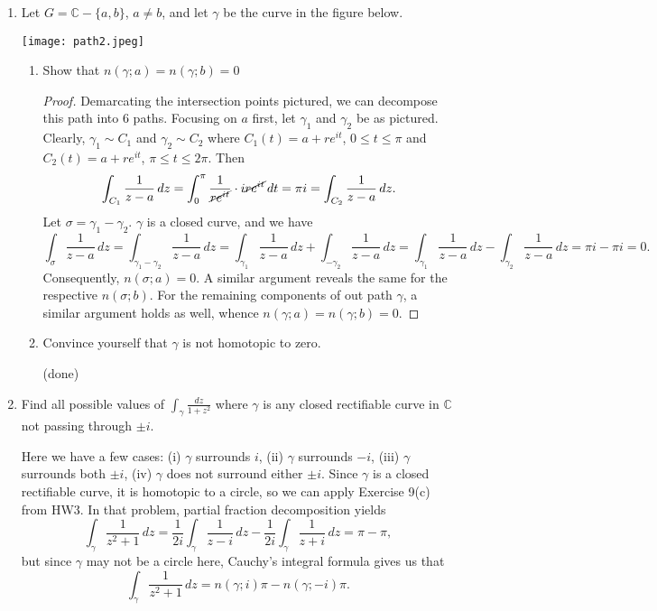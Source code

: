 \documentclass[11pt,oneside,english]{amsart}
\theoremstyle{definition}
\newcommand{\MB}[1]{\mathbb{#1}}
\begin{document}
\begin{enumerate}[leftmargin=*]
\itemsep5mm

\setcounter{enumi}{7}

\item Let $G=\MB{C}-\{a,b\}$, $a\neq b$, and let $\gamma$ be the curve in the figure below.

\begin{center}
\texttt{[image: path2.jpeg]}
\end{center}

\begin{enumerate}
\itemsep5mm
\item Show that $n(\gamma;a)=n(\gamma;b)=0$

\begin{proof}
Demarcating the intersection points pictured, we can decompose this path into 6 paths. Focusing on $a$ first, let $\gamma_1$ and $\gamma_2$ be as pictured. Clearly, $\gamma_1\sim C_1$ and $\gamma_2\sim C_2$ where $C_1(t)=a+re^{it}$, $0\leq t\leq \pi$ and $C_2(t)=a+re^{it}$, $\pi\leq t\leq 2\pi$. Then
\[
\int_{C_1}\frac{1}{z-a}\,dz=\int_0^\pi\frac{1}{\cancel{re^{it}}}\cdot i\cancel{re^{it}}\,dt=\pi i=\int_{C_2}\frac{1}{z-a}\,dz.
\]
Let $\sigma=\gamma_1-\gamma_2$. $\gamma$ is a closed curve, and we have
\[
\int_\sigma \frac{1}{z-a}\,dz=\int_{\gamma_1-\gamma_2}\frac{1}{z-a}\,dz=\int_{\gamma_1}\frac{1}{z-a}\,dz+\int_{-\gamma_2}\frac{1}{z-a}\,dz=\int_{\gamma_1}\frac{1}{z-a}\,dz-\int_{\gamma_2}\frac{1}{z-a}\,dz=\pi i-\pi i=0.
\]
Consequently, $n(\sigma;a)=0$. A similar argument reveals the same for the respective $n(\sigma;b)$. For the remaining components of out path $\gamma$, a similar argument holds as well, whence $n(\gamma;a)=n(\gamma;b)=0$.
\end{proof}

\item Convince yourself that $\gamma$ is not homotopic to zero.

(done)
\end{enumerate}

\pagebreak

\setcounter{enumi}{9}

\item Find all possible values of $\displaystyle \int_\gamma \frac{dz}{1+z^2}$ where $\gamma$ is any closed rectifiable curve in $\MB{C}$ not passing through $\pm i$.

Here we have a few cases: (i) $\gamma$ surrounds $i$, (ii) $\gamma$ surrounds $-i$, (iii) $\gamma$ surrounds both $\pm i$, (iv) $\gamma$ does not surround either $\pm i$. Since $\gamma$ is a closed rectifiable curve, it is homotopic to a circle, so we can apply Exercise 9(c) from HW3. In that problem, partial fraction decomposition yields
\[
\int_\gamma\frac{1}{z^2+1}\,dz=\frac{1}{2i}\int_\gamma\frac{1}{z-i}\,dz-\frac{1}{2i}\int_\gamma \frac{1}{z+i}\,dz=\pi -\pi,
\]
but since $\gamma$ may not be a circle here, Cauchy's integral formula gives us that
\[
\int_\gamma\frac{1}{z^2+1}\,dz=n(\gamma; i)\pi -n(\gamma;-i)\pi.
\]



\end{enumerate}
\end{document}
